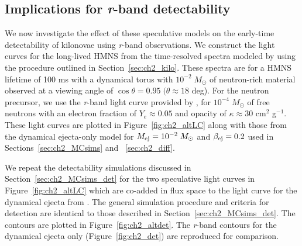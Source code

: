\subsection{Implications for {\em r}-band detectability}
\label{sec:ch2_altkilo_det}
We now investigate the effect of these speculative models on the early-time detectability of kilonovae using {\em r}-band observations. We construct the light curves for the long-lived HMNS from the time-resolved spectra modeled by \citet{Kasen+15} using the procedure outlined in Section~\ref{sec:ch2_kilo}. These spectra are for a HMNS lifetime of 100 ms with a dynamical torus with $10^{-2}\;M_{\odot}$ of neutron-rich material observed at a viewing angle of $\cos{\theta} = 0.95\; (\theta \approx 18$ deg). For the neutron precursor, we use the {\em r}-band light curve provided by \citet{Metzger+15}, for $10^{-4}\;M_{\odot}$ of free neutrons with an electron fraction of $Y_e \approx 0.05$ and opacity of $\kappa \approx 30$ cm$^2$ g$^{-1}$. These light curves are plotted in Figure~\ref{fig:ch2_altLC} along with those from the dynamical ejecta-only model for $M_{{\rm ej}} = 10^{-2}\;M_{\odot}$ and $\beta_{{\rm ej}} = 0.2$ used in Sections~\ref{sec:ch2_MCsims} and ~\ref{sec:ch2_diff}.

We repeat the detectability simulations discussed in Section~\ref{sec:ch2_MCsims_det} for the two speculative light curves in Figure~\ref{fig:ch2_altLC} which are co-added in flux space to the light curve for the dynamical ejecta from \citet{BarnesKasen13}. The general simulation procedure and criteria for detection are identical to those described in Section~\ref{sec:ch2_MCsims_det}. The contours are plotted in Figure~\ref{fig:ch2_altdet}. The {\em r}-band contours for the dynamical ejecta only (Figure~\ref{fig:ch2_det}) are reproduced for comparison.

